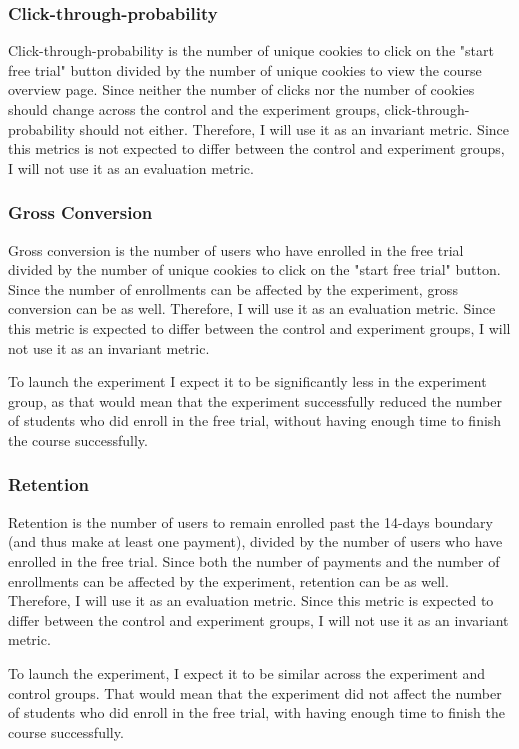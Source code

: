 \documentclass{article}
\begin{document}
\begin{multicols}{2}
\subsubsection{Click-through-probability}

Click-through-probability is the number of unique cookies to click on the "start free trial" button divided by the number of unique cookies to view the course overview page. Since neither the number of clicks nor the number of cookies should change across the control and the experiment groups, click-through-probability should not either. Therefore, I will use it as an invariant metric. Since this metrics is not expected to differ between the control and experiment groups, I will not use it as an evaluation metric.

\subsubsection{Gross Conversion}

Gross conversion is the number of users who have enrolled in the free trial divided by the number of unique cookies to click on the "start free trial" button. Since the number of enrollments can be affected by the experiment, gross conversion can be as well. Therefore, I will use it as an evaluation metric. Since this metric is expected to differ between the control and experiment groups, I will not use it as an invariant metric.

To launch the experiment I expect it to be significantly less in the experiment group, as that would mean that the experiment successfully reduced the number of students who did enroll in the free trial, without having enough time to finish the course successfully.

\subsubsection{Retention}

Retention is the number of users to remain enrolled past the 14-days boundary (and thus make at least one payment), divided by the number of users who have enrolled in the free trial. Since both the number of payments and the number of enrollments can be affected by the experiment, retention can be as well. Therefore, I will use it as an evaluation metric. Since this metric is expected to differ between the control and experiment groups, I will not use it as an invariant metric.

To launch the experiment, I expect it to be similar across the experiment and control groups. That would mean that the experiment did not affect the number of students who did enroll in the free trial, with having enough time to finish the course successfully.


\end{multicols}
\end{document}
